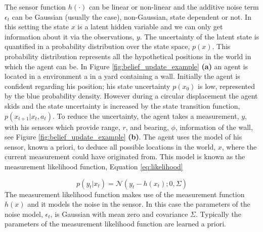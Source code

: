 The sensor function $h(\cdot)$ can be linear or non-linear and the additive noise term $\epsilon_t$ can 
be Gaussian (usually the case), non-Gaussian, state dependent or not. In this setting the
state $x$ is a latent hidden variable and we can only get information about it via the observations, $y$. 
The uncertainty of the latent state is quantified in a probability distribution over the state space, $p(x)$. 
This probability distribution represents all the hypothetical positions in the world in which the agent can be. 
In Figure \ref{fig:belief_update_example} \textbf{(a)} an agent is located in a environment a in a yard 
containing a wall. Initially the agent is confident regarding his position; his state uncertainty $p(x_0)$ is low, represented 
by the blue probability density. However during a circular displacement the agent skids and the state uncertainty is increased 
by the state transition function, $p(x_{t+1}|x_t,a_t)$. To reduce the uncertainty, the agent takes a measurement, $y$, with 
his sensors which provide range, $r$, and bearing, $\phi$, information of the wall, see Figure \ref{fig:belief_update_example} \textbf{(b)}.
The agent uses the model of his sensor, known a priori, to deduce all possible locations in the world, $x$, where the current 
measurement could have originated from. This model is known as the measurement 
likelihood function, Equation \ref{eq:likelihood}

\begin{equation}\label{eq:likelihood}
 p(y_t|x_t) = \mathcal{N}(y_t - h(x_t);0,\Sigma)
\end{equation}
The measurement likelihood function makes use of the measurement function $h(x)$ and it models the noise 
in the sensor. In this case the parameters of the noise model, $\epsilon_t$, is Gaussian with mean zero and covariance $\Sigma$.
Typically the parameters of the measurement likelihood function are learned a priori.

